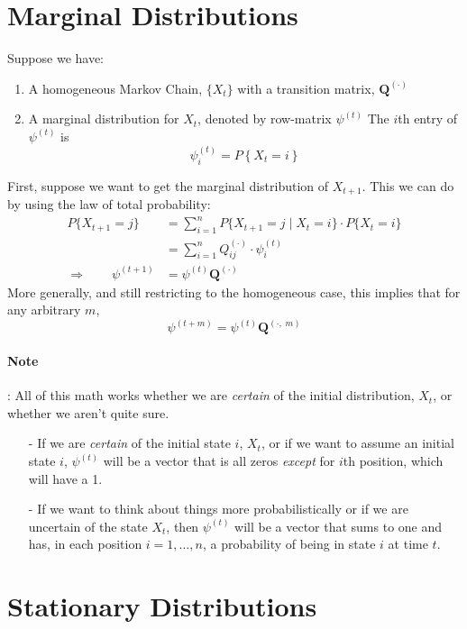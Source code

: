 \documentclass[12pt]{article}
\theoremstyle{plain}
\theoremstyle{definition}
\theoremstyle{remark}
\begin{document}
\newpage
\section{Marginal Distributions}

Suppose we have:
\begin{enumerate}
    \item A homogeneous Markov Chain, $\{X_t\}$ with a transition matrix,
	$\mathbf{Q}^{(\cdot)}$
    \item A marginal distribution for $X_t$, denoted by row-matrix $\psi^{(t)}$ 
	The $i$th entry of $\psi^{(t)}$ is
	\[ \psi^{(t)}_i = P\left\{ X_t = i \right\} \]
\end{enumerate}
First, suppose we want to get the marginal distribution of $X_{t+1}$.
This we can do by using the law of total probability:
\begin{align*}
     P\{X_{t+1} = j\} &= \sum_{i=1}^n 
	P\{X_{t+1} = j \; | \; X_t = i \} \cdot 
	P\{X_{t} = i\} \\
    &= \sum_{i=1}^n 
	Q^{(\cdot)}_{ij} \cdot 
	\psi_i^{(t)} \\
    \Rightarrow \qquad 
    \psi^{(t+1)} &= \psi^{(t)} \mathbf{Q}^{(\cdot)}
\end{align*}
More generally, and still restricting to the homogeneous case, 
this implies that for any arbitrary $m$, 
    \[ \psi^{(t+m)} = \psi^{(t)} \mathbf{Q}^{(\cdot,\; m)} \]

\paragraph{Note}: All of this math works whether we are 
\emph{certain} of the initial distribution, $X_t$, or
whether we aren't quite sure.  
\begin{itemize}
    \item[-] If we are \emph{certain} of the initial state $i$, 
	$X_t$, or if we want to assume an initial state $i$,
	$\psi^{(t)}$ will be a vector that is all zeros
	\emph{except} for $i$th position, which will have a 1.
    \item[-] If we want to think about things more probabilistically
	or if we are uncertain of the state $X_t$, then
	$\psi^{(t)}$ will be a vector that sums to one and
	has, in each position $i=1,\ldots, n$, a probability
	of being in state $i$ at time $t$.
\end{itemize}


\newpage
\section{Stationary Distributions}
\end{document}
